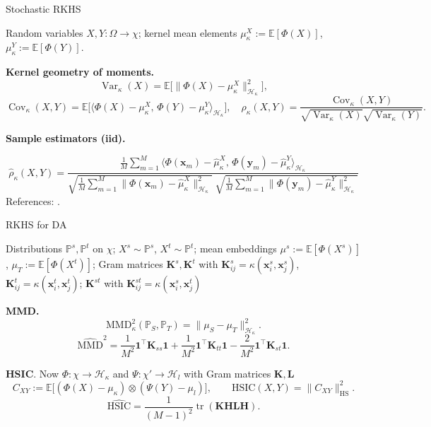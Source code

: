 \documentclass[aspectratio=169]{beamer}
\let\oldcite\cite %
\renewcommand{\cite}[1]{{\tiny\oldcite{#1}}}
\begin{document}
\begin{frame}{Stochastic RKHS}

Random variables $X,Y:\Omega\to\chi$;
kernel mean elements $\mu^{X}_{\kappa}:=\mathbb{E}[\Phi(X)]$, $\mu^{Y}_{\kappa}:=\mathbb{E}[\Phi(Y)]$. 

\medskip
\textbf{Kernel geometry of moments.}
\[
\operatorname{Var}_{\kappa}(X)=\mathbb{E}\!\big[\|\Phi(X)-\mu^{X}_{\kappa}\|_{\mathcal{H}_\kappa}^{2}\big],
\]
\[
\operatorname{Cov}_{\kappa}(X,Y)=\mathbb{E}\!\big[\langle \Phi(X)-\mu^{X}_{\kappa},\,\Phi(Y)-\mu^{Y}_{\kappa}\rangle_{\mathcal{H}_\kappa}\big],\quad
\rho_{\kappa}(X,Y)=\frac{\operatorname{Cov}_{\kappa}(X,Y)}{\sqrt{\operatorname{Var}_{\kappa}(X)}\sqrt{\operatorname{Var}_{\kappa}(Y)}}.
\]

\medskip
\textbf{Sample estimators (iid).}


$$
\widehat{\rho}_{\kappa}(X,Y)
=\frac{\tfrac{1}{M}\sum_{m=1}^{M}
\big\langle \Phi(\mathbf{x}_m)-\hat\mu^{X}_{\kappa},\,\Phi(\mathbf{y}_m)-\hat\mu^{Y}_{\kappa}\big\rangle_{\mathcal{H}_\kappa}}
{\sqrt{\tfrac{1}{M}\sum_{m=1}^{M}\!\big\|\Phi(\mathbf{x}_m)-\hat\mu^{X}_{\kappa}\big\|_{\mathcal{H}_\kappa}^{2}}\;
 \sqrt{\tfrac{1}{M}\sum_{m=1}^{M}\!\big\|\Phi(\mathbf{y}_m)-\hat\mu^{Y}_{\kappa}\big\|_{\mathcal{H}_\kappa}^{2}}}
$$
\medskip
\footnotesize References: \cite{gretton2012kernel}.
\end{frame}



\begin{frame}{RKHS for DA}

Distributions $\mathbb{P}^s,\mathbb{P}^t$ on $\chi$; $X^s\!\sim\!\mathbb{P}^s$, $X^t\!\sim\!\mathbb{P}^t$;
mean embeddings $\mu^s:=\mathbb{E}[\Phi(X^s)]$, $\mu_T:=\mathbb{E}[\Phi(X^t)]$; Gram matrices
$\mathbf{K}^s, \mathbf{K}^t$ with $\mathbf{K}^s_{ij}=\kappa(\mathbf{x}^s_i,\mathbf{x}^s_j)$,
$\mathbf{K}^t_{ij}=\kappa(\mathbf{x}^t_i,\mathbf{x}^t_j)$; $\mathbf{K}^{st}$ with
$\mathbf{K}^{st}_{ij}=\kappa(\mathbf{x}^s_i,\mathbf{x}^t_j)$

\medskip
\textbf{MMD.}
\[
\mathrm{MMD}_\kappa^{2}(\mathbb{P}_S,\mathbb{P}_T)
=\big\|\mu_S-\mu_T\big\|_{\mathcal{H}_\kappa}^{2}.
\]
\[
\widehat{\mathrm{MMD}}^{2}
=\frac{1}{M^{2}}\mathbf{1}^{\top} \mathbf{K}_{ss}\mathbf{1}
+\frac{1}{M^{2}}\mathbf{1}^{\top} \mathbf{K}_{tt}\mathbf{1}
-\frac{2}{M^{2}}\mathbf{1}^{\top} \mathbf{K}_{st}\mathbf{1}.
\]

\medskip
\textbf{HSIC}. Now  \(\Phi:\chi \to \mathcal{H}_\kappa\) and \(\Psi:\chi' \to \mathcal{H}_l\) with Gram matrices $\mathbf{K},\mathbf{L}$
\[
C_{XY}:=\mathbb{E}\big[(\Phi(X)-\mu_\kappa)\otimes(\Psi(Y)-\mu_l)\big],\qquad
\mathrm{HSIC}(X,Y)=\|C_{XY}\|_{\mathrm{HS}}^{2}.
\]
\[
\widehat{\mathrm{HSIC}}=\frac{1}{(M-1)^{2}}\operatorname{tr}(\mathbf{KHLH}).
\]
\end{frame}
\end{document}
